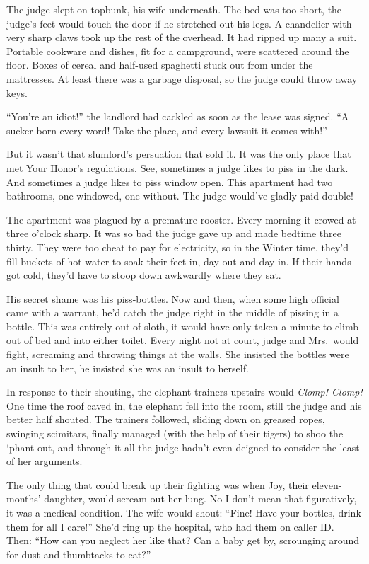 \documentclass[oneside]{book}
\begin{document}
The judge slept on topbunk, his wife underneath.
The bed was too short, the judge's feet would touch
the door if he stretched out his legs.
A chandelier with very sharp claws took up the rest
of the overhead.  It had ripped up many a suit.
Portable cookware and dishes, fit for a campground,
were scattered around the floor.
Boxes of cereal and half-used spaghetti stuck out
from under the mattresses.  At least there was
a garbage disposal, so the judge could throw away keys.

``You're an idiot!'' the landlord had cackled as soon as the lease was signed.
``A sucker born every word!  Take the place, and every
lawsuit it comes with!''

But it wasn't that slumlord's persuation that sold it.
It was the only place that met Your Honor's regulations.
See, sometimes a judge likes to piss in the dark.
And sometimes a judge likes to piss window open.
This apartment had two bathrooms, one windowed, one without.
The judge would've gladly paid double!

The apartment was plagued by a premature rooster.
Every morning it crowed at three o'clock sharp.
It was so bad the judge gave up and made bedtime
three thirty.  They were too cheat to pay for electricity,
so in the Winter time, they'd fill buckets of hot water
to soak their feet in, day out and day in.  If their hands
got cold, they'd have to stoop down awkwardly where they sat.

His secret shame was his piss-bottles.
Now and then, when some high official came with a warrant,
he'd catch the judge right in the middle of pissing in a bottle.
This was entirely out of sloth,
it would have only taken
a minute to climb out of bed and into either toilet.
Every night not at court, judge and Mrs.~would fight,
screaming and throwing things at the walls.
She insisted the bottles were an insult to her,
he insisted she was an insult to herself.

In response to their shouting, the elephant trainers upstairs
would \emph{Clomp! Clomp!}  One time the roof caved
in, the elephant fell into the room, still the judge and his
better half shouted.  The trainers followed, sliding down on
greased ropes, swinging scimitars, finally managed (with the help
of their tigers) to shoo the `phant out, and through it all the
judge hadn't even deigned to consider the least of her arguments.

The only thing that could break up their fighting
was when Joy, their eleven-months' daughter, would scream out her lung.
No I don't mean that figuratively, it was a medical condition.
The wife would shout: ``Fine!  Have your bottles, drink them for all I care!''
She'd ring up the hospital, who had them on caller ID.
Then:  ``How can you neglect her like that?  Can a baby
get by, scrounging around for dust and thumbtacks to eat?''
\end{document}

